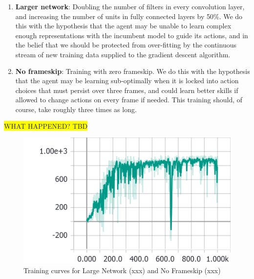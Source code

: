 \documentclass[a4paper, 11pt, conference]{ieeeconf}      %
\begin{document}
\begin{enumerate}
	\item \textbf{Larger network}: Doubling the number of filters in every convolution layer, and increasing the number of units in fully connected layers by 50\%. We do this with the hypothesis that the agent may be unable to learn complex enough representations with the incumbent model to guide its actions, and in the belief that we should be protected from over-fitting by the continuous stream of new training data supplied to the gradient descent algorithm.

	\item \textbf{No frameskip}: Training with zero frameskip. We do this with the hypothesis that the agent may be learning sub-optimally when it is locked into action choices that must persist over three frames, and could learn better skills if allowed to change actions on every frame if needed. This training should, of course, take roughly three times as long.

\end{enumerate}

\colorbox{yellow}{WHAT HAPPENED? TBD}

\begin{figure}[h!]
  \includegraphics[width=\linewidth]{figs/racecar_train_4.png}
  \caption{Training curves for Large Network (xxx) and No Frameskip (xxx)}
  \label{fig:train4}
\end{figure}
\end{document}
